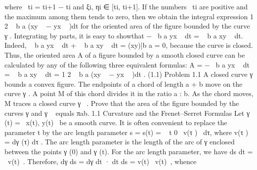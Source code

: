 \documentclass[a4paper,10pt]{article}
\begin{document}
where  ti = ti+1 − ti and ξi, ηi ∈ [ti, ti+1]. If the numbers  ti are positive and the
maximum among them tends to zero, then we obtain the integral expression
1
2
  b
a
(xy
  − yx
 
)dt
for the oriented area of the figure bounded by the curve γ . Integrating by parts, it is
easy to showthat
−  b
a
yx
 
dt =   b
a
xy
 
dt.
Indeed,
  b
a
yx
 
dt +   b
a
xy
 
dt = (xy)|b
a
= 0,
because the curve is closed.
Thus, the oriented area A of a figure bounded by a smooth closed curve can be
calculated by any of the following three equivalent formulas:
A = −  b
a
yx
 
dt =   b
a
xy
 
dt = 1
2
  b
a
(xy
  − yx
 
)dt . (1.1)
Problem 1.1 A closed curve γ bounds a convex figure. The endpoints of a chord
of length a + b move on the curve γ . A point M of this chord divides it in the ratio
a : b. As the chord moves, M traces a closed curve γ
 . Prove that the area of the
figure bounded by the curves γ and γ
  equals πab.
1.1 Curvature and the Frenet–Serret Formulas
Let γ (t) =  x(t), y(t)  be a smooth curve. It is often convenient to replace the
parameter t by the arc length parameter s = s(t) =   t
0
 v(τ )  dτ, where v(τ ) =
dγ (τ)
dτ . The arc length parameter is the length of the arc of γ enclosed between the
points γ (0) and γ (t).
For the arc length parameter, we have ds
dt
=  v(t) . Therefore, dγ
ds
= dγ
dt
· dt
ds
=
v(t)
 v(t) , whence
\end{document}
